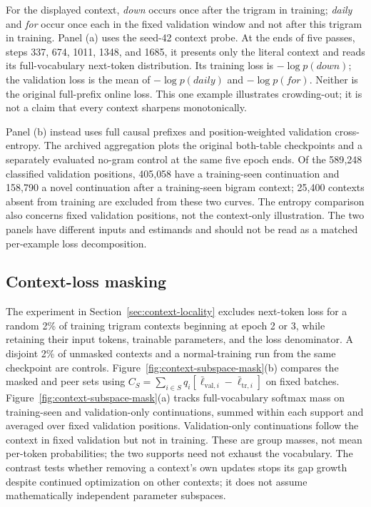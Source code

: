 For the displayed context, \emph{down} occurs once after the trigram in training; \emph{daily} and \emph{for} occur once each in the fixed validation window and not after this trigram in training. Panel (a) uses the seed-42  context probe. At the ends of five passes, steps 337, 674, 1011, 1348, and 1685, it presents only the literal context and reads its full-vocabulary next-token distribution. Its training loss is $-\log p(\textit{down})$; the validation loss is the mean of $-\log p(\textit{daily})$ and $-\log p(\textit{for})$. Neither is the original full-prefix online loss. This one example illustrates crowding-out; it is not a claim that every context sharpens monotonically.

Panel (b) instead uses full causal prefixes and position-weighted validation cross-entropy. The archived aggregation  plots the original both-table checkpoints and a separately evaluated no-gram control at the same five epoch ends. Of the 589{,}248 classified validation positions, 405{,}058 have a training-seen continuation and 158{,}790 a novel continuation after a training-seen bigram context; 25{,}400 contexts absent from training are excluded from these two curves. The entropy comparison also concerns fixed validation positions, not the context-only illustration. The two panels have different inputs and estimands and should not be read as a matched per-example loss decomposition.

\subsection{Context-loss masking}

The experiment in Section~\ref{sec:context-locality} excludes next-token loss for a random 2\% of training trigram contexts beginning at epoch 2 or 3, while retaining their input tokens, trainable parameters, and the loss denominator. A disjoint 2\% of unmasked contexts and a normal-training run from the same checkpoint are controls. Figure~\ref{fig:context-subspace-mask}(b) compares the masked and peer sets using $C_S=\sum_{i\in S}q_i[\bar\ell_{\mathrm{val},i}-\bar\ell_{\mathrm{tr},i}]$ on fixed batches. Figure~\ref{fig:context-subspace-mask}(a) tracks full-vocabulary softmax mass on training-seen and validation-only continuations, summed within each support and averaged over fixed validation positions. Validation-only continuations follow the context in fixed validation but not in training. These are group masses, not mean per-token probabilities; the two supports need not exhaust the vocabulary. The contrast tests whether removing a context's own updates stops its gap growth despite continued optimization on other contexts; it does not assume mathematically independent parameter subspaces.

